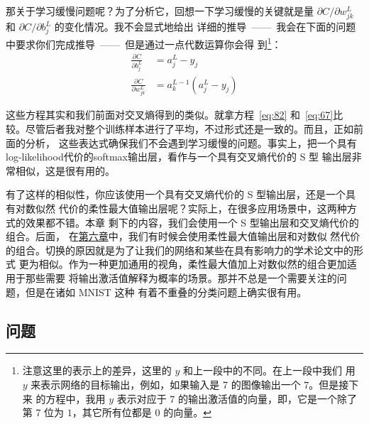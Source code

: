 那关于学习缓慢问题呢？为了分析它，回想一下学习缓慢的关键就是量 $\partial C /
\partial w^L_{jk}$ 和 $\partial C / \partial b^L_j$ 的变化情况。我不会显式地给出
详细的推导~——~我会在下面的问题中要求你们完成推导~——~但是通过一点代数运算你会得
到\footnote{注意这里的表示上的差异，这里的 $y$ 和上一段中的不同。在上一段中我们
  用 $y$ 来表示网络的目标输出，例如，如果输入是 7 的图像输出一个 $7$。但是接下来
  的方程中，我用 $y$ 表示对应于 $7$ 的输出激活值的向量，即，它是一个除了
  第 7 位为 $1$，其它所有位都是 $0$ 的向量。}：
\begin{align}
  \frac{\partial C}{\partial b^L_j} &= a^L_j-y_j \label{eq:81}\tag{81}\\
  \frac{\partial C}{\partial w^L_{jk}} &= a^{L-1}_k (a^L_j-y_j) \label{eq:82}\tag{82}
\end{align}

这些方程其实和我们前面对交叉熵得到的类似。就拿方程~\eqref{eq:82} 和~\eqref{eq:67}比
较。尽管后者我对整个训练样本进行了平均，不过形式还是一致的。而且，正如前面的分析，
这些表达式确保我们不会遇到学习缓慢的问题。事实上，把一个具有%
\gls*{log-likelihood}代价的\gls*{softmax}输出层，看作与一个具有交叉熵代价的 S 型
输出层非常相似，这是很有用的。

有了这样的相似性，你应该使用一个具有交叉熵代价的 S 型输出层，还是一个具有对数似然
代价的柔性最大值输出层呢？实际上，在很多应用场景中，这两种方式的效果都不错。本章
剩下的内容，我们会使用一个 S 型输出层和交叉熵代价的组合。后面，
在\hyperref[ch:Deeplearning]{第六章}中，我们有时候会使用柔性最大值输出层和对数似
然代价的组合。切换的原因就是为了让我们的网络和某些在具有影响力的学术论文中的形式
更为相似。作为一种更加通用的视角，柔性最大值加上对数似然的组合更加适用于那些需要
将输出激活值解释为概率的场景。那并不总是一个需要关注的问题，但是在诸如 MNIST 这种
有着不重叠的分类问题上确实很有用。

\subsection*{问题}

